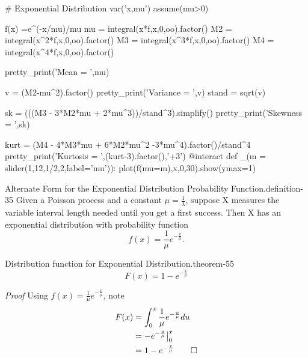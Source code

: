 \documentclass[10pt,]{book}
\makeatletter
\renewcommand*{\proofname}{Proof}
\renewenvironment{proof}[1][\proofname]{\par
  \pushQED{\qed}%
  \normalfont \topsep6\p@\@plus6\p@\relax
  \trivlist
  \item\relax
    {\itshape
    #1\@addpunct{.}}\hspace\labelsep\ignorespaces
}{%
  \popQED\endtrivlist\@endpefalse
}
\numberwithin{equation}{section}
\makeatother
\begin{document}
\hypertarget{p-1088}{}%
\leavevmode%
\begin{sageinput}
# Exponential Distribution
var('x,mu')
assume(mu>0)

f(x) =e^(-x/mu)/mu
mu = integral(x*f,x,0,oo).factor()
M2 = integral(x^2*f,x,0,oo).factor()
M3 = integral(x^3*f,x,0,oo).factor()
M4 = integral(x^4*f,x,0,oo).factor()

pretty_print('Mean = ',mu)

v = (M2-mu^2).factor()
pretty_print('Variance = ',v)
stand = sqrt(v)

sk = (((M3 - 3*M2*mu + 2*mu^3))/stand^3).simplify()
pretty_print('Skewness = ',sk)

kurt = (M4 - 4*M3*mu + 6*M2*mu^2 -3*mu^4).factor()/stand^4
pretty_print('Kurtosis = ',(kurt-3).factor(),'+3')
@interact
def _(m = slider(1,12,1/2,2,label='mu')):
    plot(f(mu=m),x,0,30).show(ymax=1)
\end{sageinput}
%
\par
\hypertarget{p-1089}{}%
\begin{definition}{Alternate Form for the Exponential Distribution Probability Function.}{definition-35}%
\hypertarget{p-1090}{}%
Given a Poisson process and a constant \(\mu = \frac{1}{\lambda}\), suppose X measures the variable interval length needed until you get a first success.  Then X has an exponential distribution with probability function%
\begin{equation*}
f(x) = \frac{1}{\mu} e^{-\frac{x}{\mu}}.
\end{equation*}
%
\end{definition}
%
\par
\hypertarget{p-1091}{}%
\begin{theorem}{Distribution function for Exponential Distribution.}{}{theorem-55}%
\hypertarget{p-1092}{}%
%
\begin{equation*}
F(x) = 1 - e^{-\frac{x}{\mu}}
\end{equation*}
%
\end{theorem}
\begin{proof}\hypertarget{proof-58}{}
\hypertarget{p-1093}{}%
Using \(f(x) = \frac{1}{\mu} e^{-\frac{x}{\mu}}\), note%
\begin{align*}
F(x) & = \int_0^x \frac{1}{\mu} e^{-\frac{u}{\mu}} du\\
& =  - e^{-\frac{u}{\mu}} \big |_0^x\\
& = 1 - e^{-\frac{x}{\mu}}\qedhere
\end{align*}
%
\end{proof}
%
\par
\end{document}
